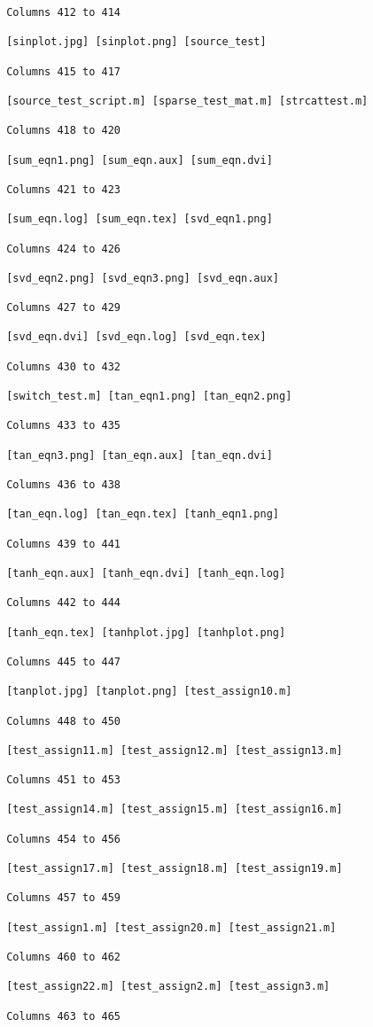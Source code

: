 \begin{verbatim}
 Columns 412 to 414

 [sinplot.jpg] [sinplot.png] [source_test] 

 Columns 415 to 417

 [source_test_script.m] [sparse_test_mat.m] [strcattest.m] 

 Columns 418 to 420

 [sum_eqn1.png] [sum_eqn.aux] [sum_eqn.dvi] 

 Columns 421 to 423

 [sum_eqn.log] [sum_eqn.tex] [svd_eqn1.png] 

 Columns 424 to 426

 [svd_eqn2.png] [svd_eqn3.png] [svd_eqn.aux] 

 Columns 427 to 429

 [svd_eqn.dvi] [svd_eqn.log] [svd_eqn.tex] 

 Columns 430 to 432

 [switch_test.m] [tan_eqn1.png] [tan_eqn2.png] 

 Columns 433 to 435

 [tan_eqn3.png] [tan_eqn.aux] [tan_eqn.dvi] 

 Columns 436 to 438

 [tan_eqn.log] [tan_eqn.tex] [tanh_eqn1.png] 

 Columns 439 to 441

 [tanh_eqn.aux] [tanh_eqn.dvi] [tanh_eqn.log] 

 Columns 442 to 444

 [tanh_eqn.tex] [tanhplot.jpg] [tanhplot.png] 

 Columns 445 to 447

 [tanplot.jpg] [tanplot.png] [test_assign10.m] 

 Columns 448 to 450

 [test_assign11.m] [test_assign12.m] [test_assign13.m] 

 Columns 451 to 453

 [test_assign14.m] [test_assign15.m] [test_assign16.m] 

 Columns 454 to 456

 [test_assign17.m] [test_assign18.m] [test_assign19.m] 

 Columns 457 to 459

 [test_assign1.m] [test_assign20.m] [test_assign21.m] 

 Columns 460 to 462

 [test_assign22.m] [test_assign2.m] [test_assign3.m] 

 Columns 463 to 465


\end{verbatim}

